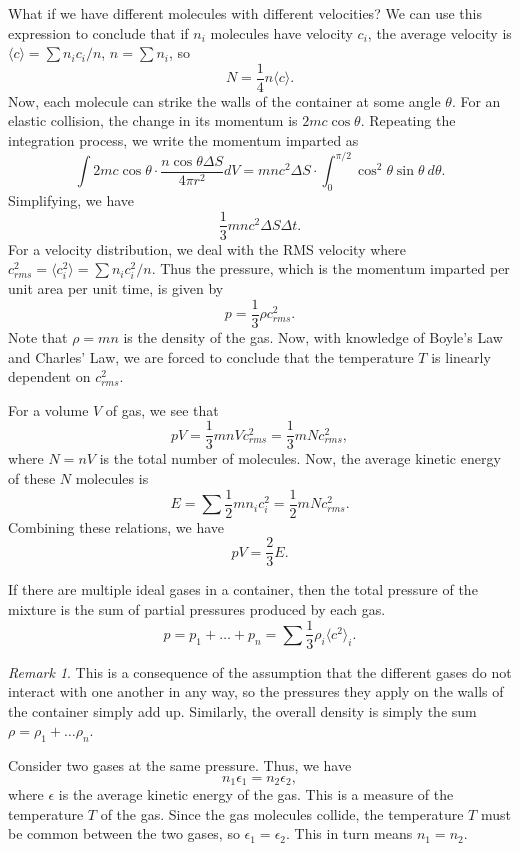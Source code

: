 \documentclass[11pt]{article}
\newcommand\E[1]{\langle #1 \rangle}
\theoremstyle{definition}
\theoremstyle{remark}
\newtheorem*{remark}{Remark}
\numberwithin{equation}{section}
\begin{document}
    What if we have different molecules with different velocities? We can use this
    expression to conclude that if $n_i$ molecules have velocity $c_i$, the average
    velocity is $\E{c} = \sum n_ic_i / n$, $n = \sum n_i$, so \[
        N = \frac{1}{4}n\E{c}.
    \] Now, each molecule can strike the walls of the container at some angle
    $\theta$. For an elastic collision, the change in its momentum is
    $2mc\cos\theta$. Repeating the integration process, we write the momentum
    imparted as \[
        \int 2mc\cos\theta \cdot\frac{n\cos\theta \Delta S}{4\pi r^2} dV =
        mnc^2\Delta S \cdot \int_0^{\pi /2}\cos^2\theta\sin\theta\:d\theta.
    \] Simplifying, we have \[
        \frac{1}{3}mnc^2\Delta S \Delta t.
    \] For a velocity distribution, we deal with the RMS velocity where $c_{rms}^2 =
    \E{c_i^2} = \sum n_ic_i^2 / n$. Thus the pressure, which is the momentum
    imparted per unit area per unit time, is given by \[
        p = \frac{1}{3}\rho c_{rms}^2.
    \] Note that $\rho = mn$ is the density of the gas.
    Now, with knowledge of Boyle's Law and Charles' Law, we are forced to conclude
    that the temperature $T$ is linearly dependent on $c_{rms}^2$.

    For a volume $V$ of gas, we see that \[
        pV = \frac{1}{3}mnVc_{rms}^2 = \frac{1}{3}mNc_{rms}^2,
    \] where $N = nV$ is the total number of molecules. Now, the average kinetic
    energy of these $N$ molecules is \[
        E = \sum \frac{1}{2}mn_ic_i^2 = \frac{1}{2}mN c_{rms}^2.
    \] Combining these relations, we have \[
        pV = \frac{2}{3} E.
    \] 

    \begin{theorem}
        If there are multiple ideal gases in a container, then the total pressure of
        the mixture is the sum of partial pressures produced by each gas.\[
            p = p_1 + \dots + p_n = \sum \frac{1}{3} \rho_i \E{c^2}_i.
        \] 
        \begin{remark}
            This is a consequence of the assumption that the different gases do not
            interact with one another in any way, so the pressures they apply on the
            walls of the container simply add up. Similarly, the overall density is
            simply the sum $\rho = \rho_1 + \dots \rho_n$.
        \end{remark}
    \end{theorem}

    Consider two gases at the same pressure. Thus, we have \[
        n_1\epsilon_1 = n_2\epsilon_2,
    \] where $\epsilon$ is the average kinetic energy of the gas. This is a measure
    of the temperature $T$ of the gas. Since the gas molecules collide, the
    temperature $T$ must be common between the two gases, so $\epsilon_1 =
    \epsilon_2$. This in turn means $n_1 = n_2$.
    
\end{document}

